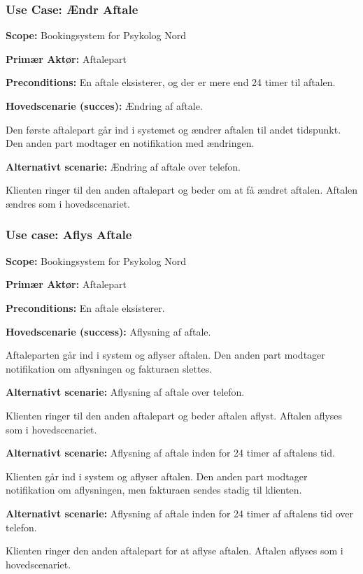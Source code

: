 \subsubsection{Use Case: Ændr Aftale}
{\setlength{\parindent}{0cm}
\textbf{Scope:} Bookingsystem for Psykolog Nord

\textbf{Primær Aktør:} Aftalepart 

\textbf{Preconditions:} En aftale eksisterer, og der er mere end 24 timer til aftalen.

\textbf{Hovedscenarie (succes):} Ændring af aftale.

Den første aftalepart går ind i systemet og ændrer aftalen til andet tidspunkt.
Den anden part modtager en notifikation med ændringen.

\textbf{Alternativt scenarie:} Ændring af aftale over telefon.

Klienten ringer til den anden aftalepart og beder om at få ændret aftalen. Aftalen ændres som i hovedscenariet.
}

\subsubsection{Use case: Aflys Aftale}
{\setlength{\parindent}{0cm}
\textbf{Scope:} Bookingsystem for Psykolog Nord

\textbf{Primær Aktør:} Aftalepart

\textbf{Preconditions:} En aftale eksisterer.

\textbf{Hovedscenarie (success):} Aflysning af aftale.

Aftaleparten går ind i system og aflyser aftalen.
Den anden part modtager notifikation om aflysningen og fakturaen slettes.

\textbf{Alternativt scenarie:} Aflysning af aftale over telefon.

Klienten ringer til den anden aftalepart og beder aftalen aflyst.
Aftalen aflyses som i hovedscenariet.

\textbf{Alternativt scenarie:} Aflysning af aftale inden for 24 timer af aftalens tid.

Klienten går ind i system og aflyser aftalen.
Den anden part modtager notifikation om aflysningen, men fakturaen sendes stadig til klienten.

\textbf{Alternativt scenarie:} Aflysning af aftale inden for 24 timer af aftalens tid over telefon.

Klienten ringer den anden aftalepart for at aflyse aftalen. Aftalen aflyses som i hovedscenariet.
}

